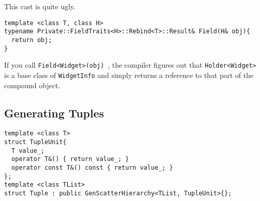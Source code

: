 This cast is quite ugly.
\begin{verbatim}
template <class T, class H>
typename Private::FieldTraits<H>::Rebind<T>::Result& Field(H& obj){
  return obj;
}
\end{verbatim}

 If you call \texttt{Field<Widget>(obj) }, the compiler figures out
 that \texttt{Holder<Widget>} is a base class of \texttt{WidgetInfo} and 
 simply returns a reference to that part of the compound object.

 \subsection{Generating Tuples}

\begin{verbatim}
template <class T>
struct TupleUnit{
  T value_;
  operator T&() { return value_; }
  operator const T&() const { return value_; }
};
template <class TList>
struct Tuple : public GenScatterHierarchy<TList, TupleUnit>{};
\end{verbatim}
